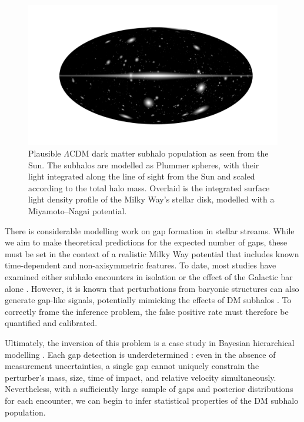         \begin{figure}
            \includegraphics[width=\linewidth]{images/mollweide-density-with-haloes.png}
            \caption[Plausible $\Lambda$CDM dark matter subhalo population as seen from the Sun]{Plausible $\Lambda$CDM dark matter subhalo population as seen from the Sun. The subhalos are modelled as Plummer spheres, with their light integrated along the line of sight from the Sun and scaled according to the total halo mass. Overlaid is the integrated surface light density profile of the Milky Way's stellar disk, modelled with a Miyamoto--Nagai potential.}
            \label{fig:mollweide-density-with-haloes.png}
        \end{figure}

        There is considerable modelling work on gap formation in stellar streams. While we aim to make theoretical predictions for the expected number of gaps, these must be set in the context of a realistic Milky Way potential that includes known time-dependent and non-axisymmetric features. To date, most studies have examined either subhalo encounters in isolation \citep{2013ApJ...775...90C,2015MNRAS.450.1136E,2016MNRAS.463..102E,2016MNRAS.457.3817S,2024arXiv241213144A,2025arXiv250207781L} or the effect of the Galactic bar alone \citep{2016MNRAS.460..497H,2016ApJ...824..104P,2017NatAs...1..633P,2023A&A...678A.180T}. However, it is known that perturbations from baryonic structures can also generate gap-like signals, potentially mimicking the effects of DM subhalos \citep{2020ApJ...891..161I}. To correctly frame the inference problem, the false positive rate must therefore be quantified and calibrated.

        Ultimately, the inversion of this problem is a case study in Bayesian hierarchical modelling \citep{2020sdmm.book.....I}. Each gap detection is underdetermined \citep{2015MNRAS.450.1136E}: even in the absence of measurement uncertainties, a single gap cannot uniquely constrain the perturber's mass, size, time of impact, and relative velocity simultaneously. Nevertheless, with a sufficiently large sample of gaps and posterior distributions for each encounter, we can begin to infer statistical properties of the DM subhalo population.


